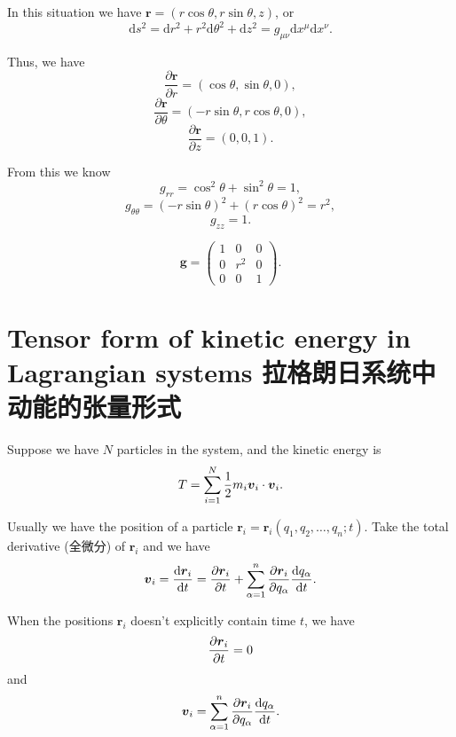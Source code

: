 \begin{itemize}
  In this situation we have
  \(\boldsymbol{r} = (r \cos \theta, r \sin \theta, z)\), or
  \[\mathrm{d} s^2 = \mathrm{d}r^2 + r^2 \mathrm{d} \theta^2 + \mathrm{d} z^2 = g_{\mu\nu} \mathrm{d}x^{\mu} \mathrm{d}x^{\nu}.\]

  Thus, we have
  \[\frac{\partial \boldsymbol{r}}{\partial r} = (\cos \theta, \sin \theta, 0),\]
  \[\frac{\partial \boldsymbol{r}}{\partial \theta} = (-r \sin \theta, r \cos \theta, 0),\]
  \[\frac{\partial \boldsymbol{r}}{\partial z} = (0, 0, 1).\]

  From this we know \[g_{rr} = \cos^2 \theta + \sin^2 \theta = 1,\]
  \[g_{\theta \theta} = (-r \sin \theta)^2 + (r \cos \theta)^2 = r^2,\]
  \[g_{zz} = 1.\]

  \[\mathbf{g} = \begin{pmatrix}
        1 & 0 & 0 \\
        0 & r^2 & 0 \\
        0 & 0 & 1
    \end{pmatrix}.\]
\end{itemize}

\section[Tensor form of Lagrangian kinetic energy 拉格朗日动能的张量形式]{Tensor form of kinetic energy in Lagrangian systems 拉格朗日系统中动能的张量形式}\label{tensor-form-of-kinetic-energy-in-lagrangian-systems-ux62c9ux683cux6717ux65e5ux7cfbux7edfux4e2dux52a8ux80fdux7684ux5f20ux91cfux5f62ux5f0f}

Suppose we have \(N\) particles in the system, and the kinetic energy is
\[T = \sum_{i = 1}^{N} {1 \over 2} m_i \boldsymbol{v}_i \cdot \boldsymbol{v}_i.\]

Usually we have the position of a particle
\(\boldsymbol{r}_i = \boldsymbol{r}_i(q_1, q_2, \dots, q_n; t)\). Take
the total derivative (全微分) of \(\boldsymbol{r}_i\) and we have
\[\boldsymbol{v}_i = {\mathrm{d} \boldsymbol{r}_i \over \mathrm{d}t} = {\partial \boldsymbol{r}_i \over \partial t} + \sum_{\alpha = 1}^{n} {\partial \boldsymbol{r}_i \over \partial q_\alpha} {\mathrm{d} q_\alpha \over \mathrm{d}t}.\]

When the positions \(\boldsymbol{r}_i\) doesn't explicitly contain time
\(t\), we have \[{\partial \boldsymbol{r}_i \over \partial t} = 0\] and
\[\boldsymbol{v}_i =  \sum_{\alpha = 1}^{n} {\partial \boldsymbol{r}_i \over \partial q_\alpha} {\mathrm{d} q_\alpha \over \mathrm{d}t}.\]

